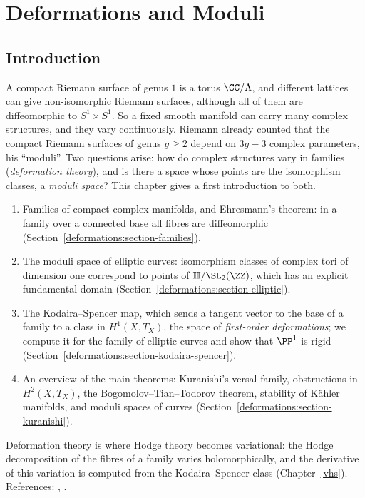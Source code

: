 \chapter{Deformations and Moduli}\label{deformations}

\section{Introduction}\label{deformations:section-introduction}

A compact Riemann surface of genus $1$ is a torus $\CC/\Lambda$, and different lattices can give non-isomorphic Riemann surfaces, although all of them are diffeomorphic to $S^1 \times S^1$. So a fixed
smooth manifold can carry many complex structures, and they vary continuously. Riemann already counted that the compact Riemann surfaces of genus $g \geq 2$ depend on $3g - 3$ complex parameters, his
``moduli''. Two questions arise: how do complex structures vary in families (\emph{deformation theory}), and is there a space whose points are the isomorphism classes, a \emph{moduli space}? This chapter
gives a first introduction to both.
\begin{enumerate}
\item Families of compact complex manifolds, and Ehresmann's theorem: in a family over a connected base all fibres are diffeomorphic
(Section~\ref{deformations:section-families}).
\item The moduli space of elliptic curves: isomorphism classes of complex tori of dimension one correspond to points of $\mathbb{H}/\SL_2(\ZZ)$, which has an explicit fundamental domain
(Section~\ref{deformations:section-elliptic}).
\item The Kodaira--Spencer map, which sends a tangent vector to the base of a family to a class in $H^1(X, T_X)$, the space of \emph{first-order deformations}; we compute it for the family of elliptic curves and
show that $\PP^1$ is rigid (Section~\ref{deformations:section-kodaira-spencer}).
\item An overview of the main theorems: Kuranishi's versal family, obstructions in $H^2(X, T_X)$, the Bogomolov--Tian--Todorov theorem, stability of K\"ahler manifolds, and moduli spaces of curves
(Section~\ref{deformations:section-kuranishi}).
\end{enumerate}
Deformation theory is where Hodge theory becomes variational: the Hodge decomposition of the fibres of a family varies holomorphically, and the derivative of this variation is computed from the
Kodaira--Spencer class (Chapter~\ref{vhs}). References: \cite[Chapter 6]{huybrechts-complex}, \cite[Chapter 9]{voisin-hodge-1}.

